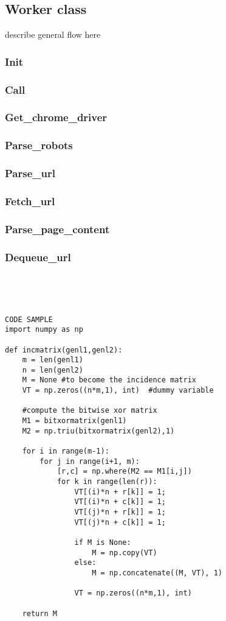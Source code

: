 \documentclass[runningheads]{llncs}
\begin{document}
\subsection{Worker class}
describe general flow here
\subsubsection{Init}
\subsubsection{Call}
\subsubsection{Get\_chrome\_driver}
\subsubsection{Parse\_robots}
\subsubsection{Parse\_url}
\subsubsection{Fetch\_url}
\subsubsection{Parse\_page\_content}
\subsubsection{Dequeue\_url}


\begin{lstlisting}




CODE SAMPLE
import numpy as np
 
def incmatrix(genl1,genl2):
    m = len(genl1)
    n = len(genl2)
    M = None #to become the incidence matrix
    VT = np.zeros((n*m,1), int)  #dummy variable
 
    #compute the bitwise xor matrix
    M1 = bitxormatrix(genl1)
    M2 = np.triu(bitxormatrix(genl2),1) 
 
    for i in range(m-1):
        for j in range(i+1, m):
            [r,c] = np.where(M2 == M1[i,j])
            for k in range(len(r)):
                VT[(i)*n + r[k]] = 1;
                VT[(i)*n + c[k]] = 1;
                VT[(j)*n + r[k]] = 1;
                VT[(j)*n + c[k]] = 1;
 
                if M is None:
                    M = np.copy(VT)
                else:
                    M = np.concatenate((M, VT), 1)
 
                VT = np.zeros((n*m,1), int)
 
    return M
\end{lstlisting}
\end{document}
